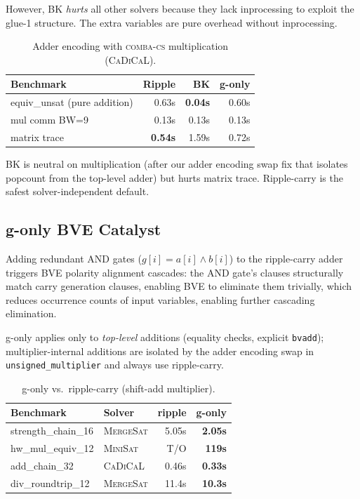 \documentclass[a4paper]{ceurart}
\newcommand{\combacs}{\textsc{comba-cs}\xspace}
\newcommand{\cadical}{\textsc{CaDiCaL}\xspace}
\newcommand{\minisat}{\textsc{MiniSat}\xspace}
\newcommand{\mergesat}{\textsc{MergeSat}\xspace}
\begin{document}
However, BK \emph{hurts} all other solvers because they lack
inprocessing to exploit the glue-1 structure. The extra variables are
pure overhead without inprocessing.

\begin{table}[ht]
\caption{Adder encoding with \combacs multiplication (\cadical).}
\label{tab:adder}
\centering
\begin{tabular}{lrrr}
\toprule
Benchmark & Ripple & BK & g-only \\
\midrule
equiv\_unsat (pure addition) & 0.63s & \textbf{0.04s} & 0.60s \\
mul comm BW=9 & 0.13s & 0.13s & 0.13s \\
matrix trace & \textbf{0.54s} & 1.59s & 0.72s \\
\bottomrule
\end{tabular}
\end{table}

BK is neutral on multiplication (after our adder encoding swap fix
that isolates popcount from the top-level adder) but hurts matrix
trace. Ripple-carry is the safest solver-independent default.

\subsection{g-only BVE Catalyst}

Adding redundant AND gates ($g[i] = a[i] \wedge b[i]$) to the
ripple-carry adder triggers BVE polarity alignment cascades: the AND
gate's clauses structurally match carry generation clauses, enabling
BVE to eliminate them trivially, which reduces occurrence counts of
input variables, enabling further cascading elimination.

g-only applies only to \emph{top-level} additions (equality
checks, explicit \texttt{bvadd}); multiplier-internal additions
are isolated by the adder encoding swap in
\texttt{unsigned\_multiplier} and always use ripple-carry.

\begin{table}[ht]
\caption{g-only vs.\ ripple-carry (shift-add multiplier).}
\label{tab:gonly}
\centering
\begin{tabular}{llrr}
\toprule
Benchmark & Solver & ripple & g-only \\
\midrule
strength\_chain\_16 & \mergesat & 5.05s & \textbf{2.05s} \\
hw\_mul\_equiv\_12 & \minisat & T/O & \textbf{119s} \\
add\_chain\_32 & \cadical & 0.46s & \textbf{0.33s} \\
div\_roundtrip\_12 & \mergesat & 11.4s & \textbf{10.3s} \\
\bottomrule
\end{tabular}
\end{table}
\end{document}
